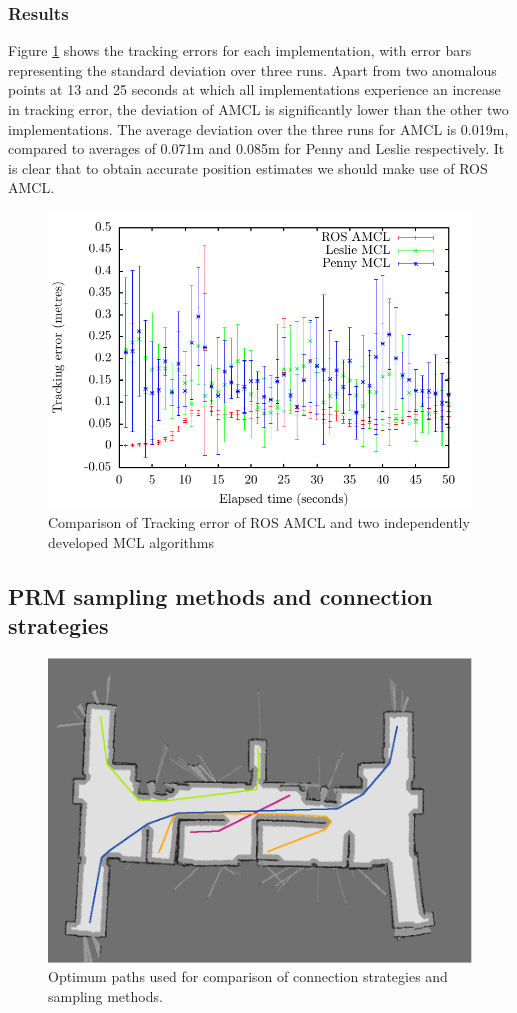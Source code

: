 \documentclass[conference]{IEEEtran}
\begin{document}
\subsubsection{Results}
Figure \ref{fig:local} shows the tracking errors for each implementation, with error bars representing the standard deviation over three runs. Apart from two anomalous points at 13 and 25 seconds at which all implementations experience an increase in tracking error, the deviation of AMCL is significantly lower than the other two implementations. The average deviation over the three runs for AMCL is 0.019m, compared to averages of 0.071m and 0.085m for Penny and Leslie respectively. It is clear that to obtain accurate position estimates we should make use of ROS AMCL.
\begin{figure}
  \includegraphics[width=\columnwidth]{tracking_stdev}
  \caption{Comparison of Tracking error of ROS AMCL and two independently developed MCL algorithms}
  \label{fig:local}
\end{figure}
\subsection{PRM sampling methods and connection strategies}
\begin{figure}
  \includegraphics[width=\columnwidth]{optimumpaths}
  \caption{Optimum paths used for comparison of connection strategies and sampling methods.}
  \label{fig:optimum}
\end{figure}
\end{document}
